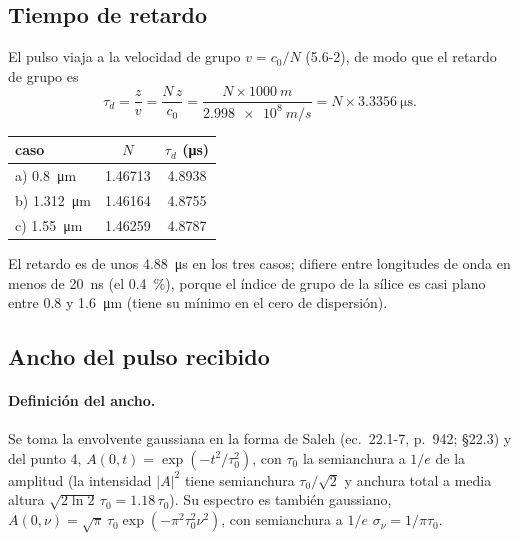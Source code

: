 \documentclass{article}
\newcommand{\um}{\si{\micro\metre}}
\begin{document}
\subsection*{Tiempo de retardo}

El pulso viaja a la velocidad de grupo $v=c_0/N$ (5.6-2), de modo que el retardo de grupo es
\[
\tau_d=\frac{z}{v}=\frac{N\,z}{c_0}=\frac{N\times\SI{1000}{m}}{\SI{2.998e8}{m/s}}
=N\times\SI{3.3356}{\micro\second}.
\]
\begin{center}
\begin{tabular}{lS[table-format=1.5]S[table-format=1.4]}
\toprule
caso & {$N$} & {$\tau_d$ (\si{\micro\second})}\\
\midrule
a) \SI{0.8}{\um}   & 1.46713 & 4.8938\\
b) \SI{1.312}{\um} & 1.46164 & 4.8755\\
c) \SI{1.55}{\um}  & 1.46259 & 4.8787\\
\bottomrule
\end{tabular}
\end{center}
El retardo es de unos \SI{4.88}{\micro\second} en los tres casos; difiere entre longitudes de
onda en menos de \SI{20}{ns} (el \SI{0.4}{\percent}), porque el índice de grupo de la sílice es
casi plano entre \SI{0.8}{} y \SI{1.6}{\um} (tiene su mínimo en el cero de dispersión).

\subsection*{Ancho del pulso recibido}

\paragraph{Definición del ancho.} Se toma la envolvente gaussiana en la forma de Saleh (ec.~22.1-7,
p.~942; §22.3) y del punto 4, $A(0,t)=\exp(-t^2/\tau_0^2)$, con $\tau_0$ la semianchura a $1/e$ de la amplitud
(la intensidad $|A|^2$ tiene semianchura $\tau_0/\sqrt2$ y anchura total a media altura
$\sqrt{2\ln2}\,\tau_0=1.18\,\tau_0$). Su espectro es también gaussiano,
$A(0,\nu)=\sqrt\pi\,\tau_0\exp(-\pi^2\tau_0^2\nu^2)$, con semianchura a $1/e$
$\sigma_\nu=1/\pi\tau_0$.
\end{document}
